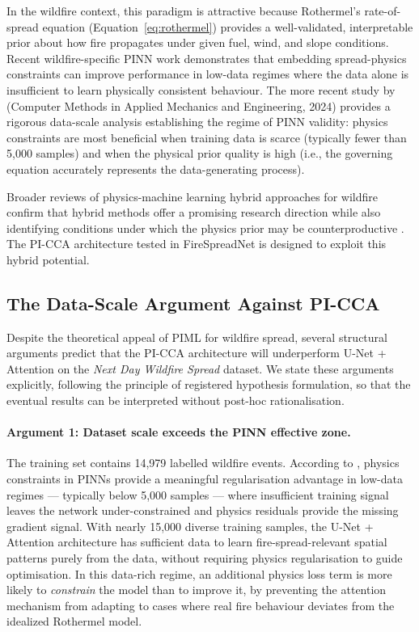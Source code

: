 In the wildfire context, this paradigm is attractive because Rothermel's rate-of-spread equation (Equation~\ref{eq:rothermel}) provides a well-validated, interpretable prior about how fire propagates under given fuel, wind, and slope conditions.
Recent wildfire-specific PINN work \citep{wildfirepinn2025} demonstrates that embedding spread-physics constraints can improve performance in low-data regimes where the data alone is insufficient to learn physically consistent behaviour.
The more recent study by \citet{wildfirecmame2024} (Computer Methods in Applied Mechanics and Engineering, 2024) provides a rigorous data-scale analysis establishing the regime of PINN validity: physics constraints are most beneficial when training data is scarce (typically fewer than 5,000 samples) and when the physical prior quality is high (i.e., the governing equation accurately represents the data-generating process).

Broader reviews of physics-machine learning hybrid approaches for wildfire confirm that hybrid methods offer a promising research direction while also identifying conditions under which the physics prior may be counterproductive \citep{singh2024physmlreview,wildfireforestry2024}.
The PI-CCA architecture tested in FireSpreadNet is designed to exploit this hybrid potential.

\subsection{The Data-Scale Argument Against PI-CCA}

Despite the theoretical appeal of PIML for wildfire spread, several structural arguments predict that the PI-CCA architecture will underperform U-Net + Attention on the \textit{Next Day Wildfire Spread} dataset.
We state these arguments explicitly, following the principle of registered hypothesis formulation, so that the eventual results can be interpreted without post-hoc rationalisation.

\paragraph{Argument 1: Dataset scale exceeds the PINN effective zone.}
The training set contains 14,979 labelled wildfire events.
According to \citet{wildfirecmame2024}, physics constraints in PINNs provide a meaningful regularisation advantage in low-data regimes — typically below 5,000 samples — where insufficient training signal leaves the network under-constrained and physics residuals provide the missing gradient signal.
With nearly 15,000 diverse training samples, the U-Net + Attention architecture has sufficient data to learn fire-spread-relevant spatial patterns purely from the data, without requiring physics regularisation to guide optimisation.
In this data-rich regime, an additional physics loss term is more likely to \emph{constrain} the model than to improve it, by preventing the attention mechanism from adapting to cases where real fire behaviour deviates from the idealized Rothermel model.

